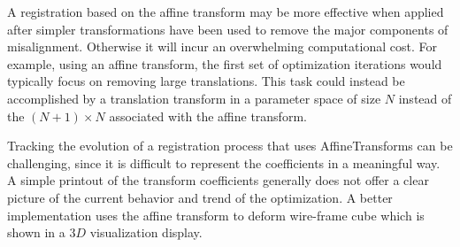 A registration based on the affine transform may be more effective when
applied after simpler transformations have been used to remove the major
components of misalignment. Otherwise it will incur an overwhelming
computational cost. For example, using an affine transform, the first set of
optimization iterations would typically focus on removing large
translations. This task could instead be accomplished by a translation
transform in a parameter space of size $N$ instead of the $(N+1) \times N$
associated with the affine transform.

Tracking the evolution of a registration process that uses
AffineTransforms can be challenging, since it is difficult to
represent the coefficients in a meaningful way.  A simple printout of the
transform coefficients generally does not offer a clear picture of the current
behavior and trend of the optimization.  A better implementation uses
the affine transform to deform wire-frame cube which is shown in a $3D$
visualization display.



